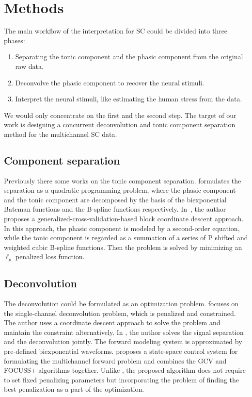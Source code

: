 \documentclass[10pt,conference]{ieeeconf}
\begin{document}
\section{Methods}

The main workflow of the interpretation for SC could be divided into three phases:

\begin{enumerate}
  \item Separating the tonic component and the phasic component from the original raw data.
  \item Deconvolve the phasic component to recover the neural stimuli.
  \item Interpret the neural stimuli, like estimating the human stress from the data.
\end{enumerate}

We would only concentrate on the first and the second step. The target of our work is designing a concurrent deconvolution and tonic component separation method for the multichannel SC data.

\subsection{Component separation}

Previously there some works on the tonic component separation. \cite{greco2014electrodermal} formulates the separation as a quadratic programming problem, where the phasic component and the tonic component are decomposed by the basis of the biexponential Bateman functions and the B-spline functions respectively. In~\cite{amin2019tonic}, the author proposes a generalized-cross-validation-based block coordinate descent approach. In this approach, the phasic component is modeled by a second-order equation, while the tonic component is regarded as a summation of a series of P shifted and weighted cubic B-spline functions. Then the problem is solved by minimizing an $\ell_p$ penalized loss function.

\subsection{Deconvolution}

The deconvolution could be formulated as an optimization problem. \cite{wickramasuriya2019skin} focuses on the single-channel deconvolution problem, which is penalized and constrained. The author uses a coordinate descent approach to solve the problem and maintain the constraint alternatively. In \cite{hernando2017feature}, the author solves the signal separation and the deconvolution jointly. The forward modeling system is approximated by pre-defined biexponential waveforms. \cite{amin2019robust} proposes a state-space control system for formulating the multichannel forward problem and combines the GCV and FOCUSS+ algorithms together. Unlike \cite{amin2019tonic}, the proposed algorithm does not require to set fixed penalizing parameters but incorporating the problem of finding the best penalization as a part of the optimization.
\end{document}
